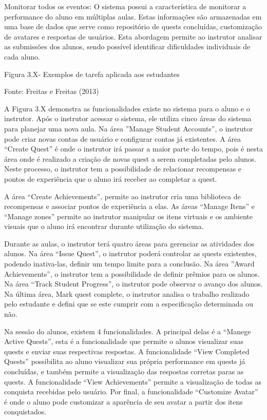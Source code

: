 \documentclass[
	12pt,				%
	oneside,			%
	a4paper,			%
	english,			%
	french,				%
	spanish,			%
	brazil,				%
	]{abntex2}
\begin{document}
Monitorar todos os eventos: O sistema possui a característica de monitorar a performance do aluno em múltiplas aulas. Estas informações são armazenadas em uma base de dados que serve como repositório de quests concluídas, customização de avatares e respostas de usuários. Esta abordagem permite ao instrutor analisar as submissões dos alunos, sendo possível identificar dificuldades individuais de cada aluno. 

Figura 3.X- Exemplos de tarefa aplicada aos estudantes

Fonte: Freitas e Freitas (2013)

A Figura 3.X demonstra as funcionalidades existe no sistema para o aluno e o instrutor.
Após o instrutor acessar o sistema, ele utiliza cinco áreas do sistema para planejar uma nova aula. Na área ”Manage Student Accounts”, o instrutor pode criar novas contas de usuário e configurar contas já existentes. A área “Create Quest” é onde o instrutor irá passar a maior parte do tempo, pois é nesta área onde é realizado a criação de novas quest a serem completadas pelo alunos. Neste processo, o instrutor tem a possibilidade de relacionar recompensas e pontos de experiência que o aluno irá receber ao completar a quest. 

A área “Create Achievements”, permite ao instrutor cria uma biblioteca de recompensas e associar pontos de experiência a elas. As áreas “Manage Itens” e “Manage zones” permite ao instrutor manipular os itens virtuais e os ambiente visuais que o aluno irá encontrar durante utilização do sistema.

Durante as aulas, o instrutor terá quatro áreas para gerenciar as atividades dos alunos. Na área “Issue Quest”, o instrutor poderá controlar as quests existentes, podendo inativa-las, definir um tempo limite para a conclusão. Na área ”Award Achievements”, o instrutor tem a possibilidade de definir prêmios para os alunos. Na área “Track Student Progress”, o instrutor pode observar o avanço dos alunos. Na última área, Mark quest complete, o instrutor analisa o trabalho realizado pelo estudante e defini que se este cumprir com a especificação determinada ou não.

Na sessão do alunos, existem 4 funcionalidades. A principal delas é a “Manege Active Quests”, esta é a funcionalidade que permite o alunos visualizar suas quests e enviar suas respectivas respostas. A funcionalidade “View Completed Quests” possibilita ao aluno visualizar sua própria performance em quests já concluídas, e também permite a visualização das respostas corretas paras as quests. A funcionalidade “View Achievements” permite a visualização de todas as conquista recebidas pelo usuário. Por final, a funcionalidade “Customize Avatar” é onde o aluno pode customizar a aparência de seu avatar a partir dos itens conquistados.
\end{document}
